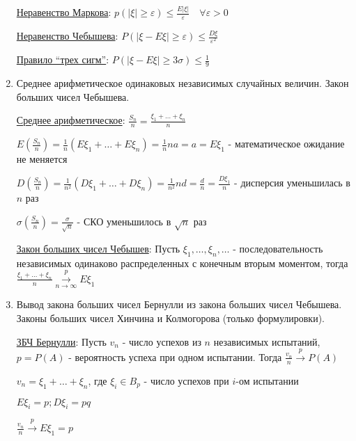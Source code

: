 \begin{enumerate}
    \hyperlink{markovsinequality}{Неравенство Маркова}: \Ths $p(|\xi| \geq \varepsilon) \leq \frac{E|\xi|}{\varepsilon} \quad \forall \varepsilon > 0$
    
    \hyperlink{chebyshevsinequality}{Неравенство Чебышева}: \Ths $P(|\xi - E\xi| \geq \varepsilon) \leq \frac{D\xi}{\varepsilon^2}$
    
    \hyperlink{ruleofthreesigmas}{Правило \enquote{трех сигм}}: \Ths $P(|\xi - E\xi| \geq 3\sigma) \leq \frac{1}{9}$

    \item Среднее арифметическое одинаковых независимых случайных величин. Закон больших чисел Чебышева.

    \hyperlink{averagevalueofrandomvariables}{Среднее арифметическое}: $\frac{S_n}{n} = \frac{\xi_1 + \dots + \xi_n}{n}$

    $E\left(\frac{S_n}{n}\right) = \frac{1}{n} (E\xi_1 + \dots + E\xi_n) = \frac{1}{n} na = a = E\xi_1$ - математическое ожидание не меняется

    $D\left(\frac{S_n}{n}\right) = \frac{1}{n^2} (D\xi_1 + \dots + D\xi_n) = \frac{1}{n^2} nd = \frac{d}{n} = \frac{D\xi_1}{n}$ - дисперсия уменьшилась в $n$ раз

    $\sigma\left(\frac{S_n}{n}\right) = \frac{\sigma}{\sqrt{n}}$ - СКО уменьшилось в $\sqrt{n}$ раз

    \hyperlink{lawofbignumberschebyshev}{Закон больших чисел Чебышев}: \Ths Пусть $\xi_1, \dots, \xi_n, \dots$ - последовательность независимых одинаково распределенных с конечным вторым моментом,
    тогда $\frac{\xi_1 + \dots + \xi_n}{n} \overset{p}{\underset{n \to \infty}{\longrightarrow}} E\xi_1$

    \item Вывод закона больших чисел Бернулли из закона больших чисел Чебышева. Законы больших чисел Хинчина и Колмогорова (только формулировки).

    \hyperlink{lawofbignumbersbernoulli2}{ЗБЧ Бернулли}: \Ths Пусть $v_n$ - число успехов из $n$ независимых испытаний, $p = P(A)$ - вероятность успеха при одном испытании.
    Тогда $\frac{v_n}{n} \overset{p}{\longrightarrow} P(A)$

    \begin{MyProof}
        $v_n = \xi_1 + \dots + \xi_n$, где $\xi_i \in B_p$ - число успехов при $i$-ом испытании

        $E\xi_i = p; D\xi_i = pq$

        $\frac{v_n}{n} \overset{p}{\longrightarrow} E\xi_1 = p$


\end{MyProof}
\end{enumerate}
